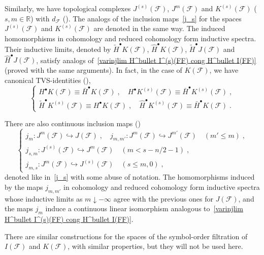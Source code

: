 \documentclass{memo-l}
\theoremstyle{plain}
\theoremstyle{definition}
\theoremstyle{remark}
\newcommand{\R}{\mathbb{R}}
\newcommand{\FF}{\mathcal{F}}
\numberwithin{section}{chapter}
\numberwithin{equation}{section}%
\begin{document}
Similarly, we have topological complexes $J^{(s)}(\FF)$, $J^m(\FF)$ and $K^{(s)}(\FF)$ ($s,m\in\R$) with $d_\FF$ (). The analogs of the inclusion maps~\eqref{j_s} for the spaces $J^{(s)}(\FF)$ and $K^{(s)}(\FF)$ are denoted in the same way. The induced homomorphisms in cohomology and reduced cohomology form inductive spectra. Their inductive limits, denoted by $\widetilde H^\bullet K(\FF)$, $\widehat H^\bullet K(\FF)$, $\widetilde H^\bullet J(\FF)$ and $\widehat H^\bullet J(\FF)$, satisfy analogs of~\eqref{varinjlim H^bullet I^(s)(FF) cong H^bullet I(FF)} (proved with the same arguments). In fact, in the case of $K(\FF)$, we have  canonical TVS-identities (),
\begin{equation}\label{HK(FF) equiv bar HK(FF)}
\left\{
\begin{gathered}
H^\bullet K(\FF)\equiv\bar H^\bullet K(\FF)\;,\quad H^\bullet K^{(s)}(\FF)\equiv\bar H^\bullet K^{(s)}(\FF)\;,\\
\widetilde H^\bullet K^{(s)}(\FF)\equiv H^\bullet K(\FF)\;,\quad
\widehat H^\bullet K^{(s)}(\FF)\equiv\bar H^\bullet K(\FF)\;.
\end{gathered}
\right.
\end{equation}

There are also continuous inclusion maps ()
\begin{equation}\label{j_m}
\left\{
\begin{gathered}
j_m:J^m(\FF)\hookrightarrow J(\FF)\;,\quad j_{m,m'}:J^m(\FF)\hookrightarrow J^{m'}(\FF)\quad(m'\le m)\;,\\
j_{s,m}:J^{(s)}(\FF)\hookrightarrow J^m(\FF)\quad(m<s-n/2-1)\;,\\
j_{m,s}:J^m(\FF)\hookrightarrow J^{(s)}(\FF)\quad(s\le m,0)\;, 
\end{gathered}
\right.
\end{equation}
denoted like in~\eqref{j_s} with some abuse of notation. The homomorphisms induced by the maps $j_{m,m'}$ in cohomology and reduced cohomology form inductive spectra whose inductive limits as $m\downarrow-\infty$ agree with the previous ones for $J(\FF)$, and the maps $j_m$ induce a continuous linear isomorphism analogous to~\eqref{varinjlim H^bullet I^(s)(FF) cong H^bullet I(FF)}.

There are similar constructions for the spaces of the symbol-order filtration of $I(\FF)$ and $K(\FF)$, with similar properties, but they will not be used here.
\end{document}
